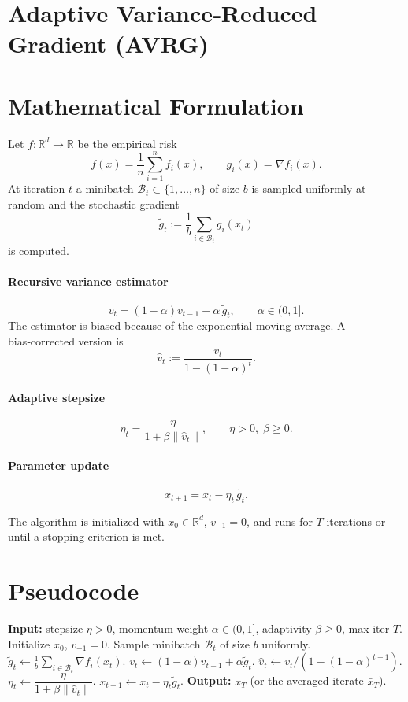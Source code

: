 \documentclass{article}
\begin{document}
\section*{Adaptive Variance‑Reduced Gradient (AVRG)}

\section*{Mathematical Formulation}
Let $f:\mathbb{R}^d\rightarrow\mathbb{R}$ be the empirical risk
\[
f(x)=\frac{1}{n}\sum_{i=1}^{n}f_i(x),\qquad 
g_i(x)=\nabla f_i(x).
\]
At iteration $t$ a minibatch $\mathcal{B}_t\subset\{1,\dots,n\}$ of size $b$ is sampled uniformly at random and the stochastic gradient
\[
\tilde g_t:=\frac{1}{b}\sum_{i\in\mathcal{B}_t} g_i(x_t)
\]
is computed.  

\paragraph{Recursive variance estimator}
\[
v_t=(1-\alpha)v_{t-1}+\alpha\,\tilde g_t,\qquad \alpha\in(0,1].
\tag{1}
\]
The estimator is biased because of the exponential moving average.  A bias‑corrected version is
\[
\hat v_t:=\frac{v_t}{1-(1-\alpha)^t}.
\tag{2}
\]

\paragraph{Adaptive stepsize}
\[
\eta_t=\frac{\eta}{1+\beta\|\hat v_t\|},\qquad \eta>0,\;\beta\ge 0.
\tag{3}
\]

\paragraph{Parameter update}
\[
x_{t+1}=x_t-\eta_t \,\tilde g_t .
\tag{4}
\]

The algorithm is initialized with $x_0\in\mathbb{R}^d$, $v_{-1}=0$, and runs for $T$ iterations or until a stopping criterion is met.

\section*{Pseudocode}
\begin{algorithm}[H]
\caption{Adaptive Variance‑Reduced Gradient (AVRG)}
\begin{algorithmic}[1]
\State \textbf{Input:} stepsize $\eta>0$, momentum weight $\alpha\in(0,1]$, adaptivity $\beta\ge0$, max iter $T$.
\State Initialize $x_0$, $v_{-1}=0$.
    \State Sample minibatch $\mathcal{B}_t$ of size $b$ uniformly.
    \State $\tilde g_t\gets\frac{1}{b}\sum_{i\in\mathcal{B}_t}\nabla f_i(x_t)$.
    \State $v_t\gets (1-\alpha)v_{t-1}+ \alpha \tilde g_t$.
    \State $\hat v_t\gets v_t/(1-(1-\alpha)^{t+1})$.
    \State $\eta_t\gets \dfrac{\eta}{1+\beta\|\hat v_t\|}$.
    \State $x_{t+1}\gets x_t-\eta_t \tilde g_t$.
\EndFor
\State \textbf{Output:} $x_T$ (or the averaged iterate $\bar x_T$).
\end{algorithmic}
\end{algorithm}
\end{document}
